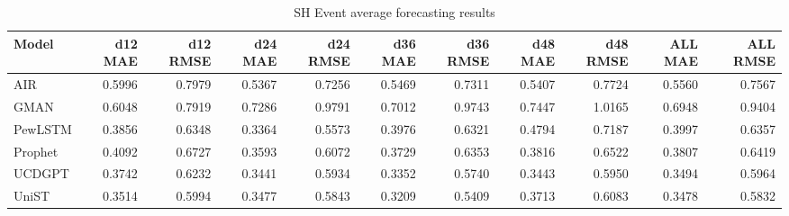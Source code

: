 \begin{table}[htbp]
\centering
\small
\caption{SH Event average forecasting results}
\label{tab:sh-event-average}
\begin{tabular}{lrrrrrrrrrr}
\toprule
Model & d12 MAE & d12 RMSE & d24 MAE & d24 RMSE & d36 MAE & d36 RMSE & d48 MAE & d48 RMSE & ALL MAE & ALL RMSE \\
\midrule
AIR & 0.5996 & 0.7979 & 0.5367 & 0.7256 & 0.5469 & 0.7311 & 0.5407 & 0.7724 & 0.5560 & 0.7567 \\
GMAN & 0.6048 & 0.7919 & 0.7286 & 0.9791 & 0.7012 & 0.9743 & 0.7447 & 1.0165 & 0.6948 & 0.9404 \\
PewLSTM & 0.3856 & 0.6348 & 0.3364 & 0.5573 & 0.3976 & 0.6321 & 0.4794 & 0.7187 & 0.3997 & 0.6357 \\
Prophet & 0.4092 & 0.6727 & 0.3593 & 0.6072 & 0.3729 & 0.6353 & 0.3816 & 0.6522 & 0.3807 & 0.6419 \\
UCDGPT & 0.3742 & 0.6232 & 0.3441 & 0.5934 & 0.3352 & 0.5740 & 0.3443 & 0.5950 & 0.3494 & 0.5964 \\
UniST & 0.3514 & 0.5994 & 0.3477 & 0.5843 & 0.3209 & 0.5409 & 0.3713 & 0.6083 & 0.3478 & 0.5832 \\
\bottomrule
\end{tabular}
\end{table}
